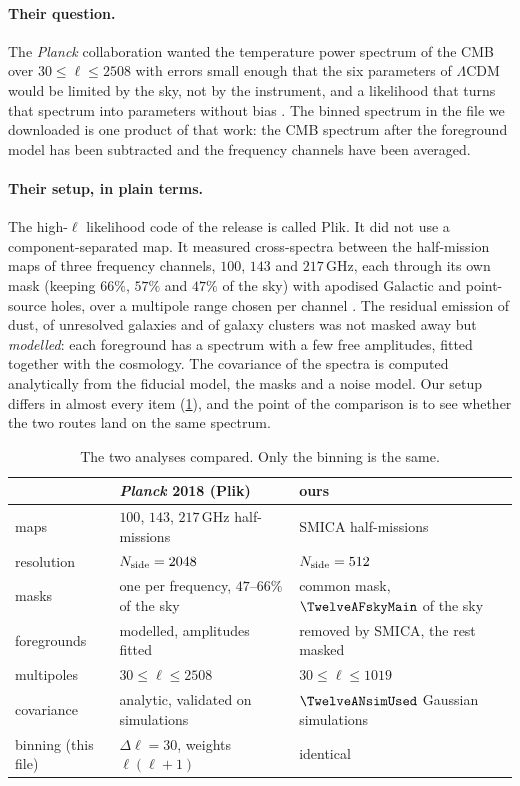 \paragraph{Their question.} The \textit{Planck} collaboration wanted the temperature power spectrum of the CMB
over $30\le\ell\le2508$ with errors small enough that the six parameters of $\Lambda$CDM would be limited by
the sky, not by the instrument, and a likelihood that turns that spectrum into parameters without bias
\cite[§1, §3]{Planck2018V}. The binned spectrum in the file we downloaded is one product of that work: the
CMB spectrum after the foreground model has been subtracted and the frequency channels have been averaged.

\paragraph{Their setup, in plain terms.} The high-$\ell$ likelihood code of the release is called Plik. It did not use a component-separated map. It measured
cross-spectra between the half-mission maps of three frequency channels, $100$, $143$ and $217$\,GHz, each
through its own mask (keeping $66\%$, $57\%$ and $47\%$ of the sky) with apodised Galactic and point-source
holes, over a multipole range chosen per channel \cite[§3.2.1--3.2.4, Table~13]{Planck2018V}. The residual
emission of dust, of unresolved galaxies and of galaxy clusters was not masked away but \emph{modelled}: each
foreground has a spectrum with a few free amplitudes, fitted together with the cosmology. The covariance
of the spectra is computed analytically from the fiducial model, the masks and a noise model. Our setup
differs in almost every item (\cref{13a:tab:compare}), and the point of the comparison is to see whether the
two routes land on the same spectrum.

\begin{table}[htbp]
\centering\small
\begin{tabular}{@{}lll@{}}
\toprule
 & \textit{Planck} 2018 (Plik) & ours\\
\midrule
maps & $100$, $143$, $217$\,GHz half-missions & SMICA half-missions\\
resolution & $N_{\rm side}=2048$ & $N_{\rm side}=512$\\
masks & one per frequency, $47$--$66\%$ of the sky & common mask, $\TwelveAFskyMain$ of the sky\\
foregrounds & modelled, amplitudes fitted & removed by SMICA, the rest masked\\
multipoles & $30\le\ell\le2508$ & $30\le\ell\le1019$\\
covariance & analytic, validated on simulations & $\TwelveANsimUsed$ Gaussian simulations\\
binning (this file) & $\Delta\ell=30$, weights $\ell(\ell+1)$ & identical\\
\bottomrule
\end{tabular}
\caption{The two analyses compared. Only the binning is the same.}
\label{13a:tab:compare}
\end{table}

